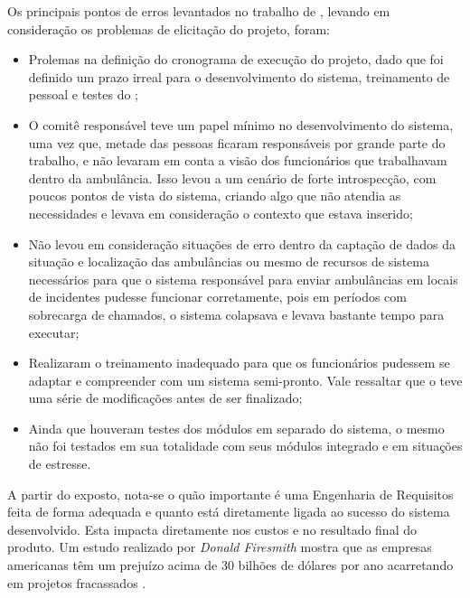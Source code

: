 Os principais pontos de erros levantados no trabalho de \cite{LodonFiasco}, levando em consideração os problemas de elicitação do projeto, foram:

\begin{itemize}
    \item Prolemas na definição do cronograma de execução do projeto, dado que foi definido um prazo irreal para o desenvolvimento do sistema, treinamento de pessoal e testes do ;
    
    \item O comitê responsável teve um papel mínimo no desenvolvimento do sistema, uma vez que, metade das pessoas ficaram responsáveis por grande parte do trabalho, e não levaram em conta a visão dos funcionários que trabalhavam dentro da ambulância. Isso levou a um cenário de forte introspecção, com poucos pontos de vista do sistema, criando algo que não atendia as necessidades e levava em consideração o contexto que estava inserido;
    
    \item Não levou em consideração situações de erro dentro da captação de dados da situação e localização das ambulâncias ou mesmo de recursos de sistema necessários para que o sistema responsável para enviar ambulâncias em locais de incidentes pudesse funcionar corretamente, pois em períodos com sobrecarga de chamados, o sistema colapsava e levava bastante tempo para executar;
    
    \item Realizaram o treinamento inadequado para que os funcionários pudessem se adaptar e compreender com um sistema semi-pronto. Vale ressaltar que o  teve uma série de modificações antes de ser finalizado;
    
    \item Ainda que houveram testes dos módulos em separado do sistema, o mesmo não foi testados em sua totalidade com seus módulos integrado e em situações de estresse.
\end{itemize}

A partir do exposto, nota-se o quão importante é uma Engenharia de Requisitos feita de forma adequada e quanto está diretamente ligada ao sucesso do sistema desenvolvido. Esta impacta diretamente nos custos e no resultado final do produto. Um estudo realizado por \textit{Donald Firesmith} mostra que as empresas americanas têm um prejuízo acima de 30 bilhões de dólares por ano acarretando em projetos fracassados \cite{king2008cost}.
